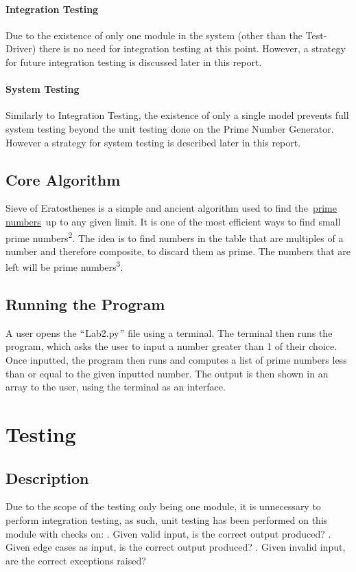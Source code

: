 \documentclass[]{article}
\begin{document}
\paragraph{Integration Testing}
Due to the existence of only one module in the system (other than the Test-Driver) there is no need for integration testing at this point. However, a strategy for future integration testing is discussed later in this report.

\paragraph{System Testing}
Similarly to Integration Testing, the existence of only a single model prevents full system testing beyond the unit testing done on the Prime Number Generator. However a strategy for system testing is described later in this report.

\subsection{Core Algorithm}
Sieve of Eratosthenes is a simple and ancient algorithm used to find the \href{https://brilliant.org/wiki/prime-numbers/}{prime numbers} up to any given limit. It is one of the most efficient ways to find small prime numbers\textsuperscript{2}. The idea is to find numbers in the table that are multiples of a number and therefore composite, to discard them as prime. The numbers that are left will be prime numbers\textsuperscript{3}.

\subsection{Running the Program}
A user opens the $``$Lab2.py$"$  file using a terminal. The terminal then runs the program, which asks the user to input a number greater than 1 of their choice. Once inputted, the program then runs and computes a list of prime numbers less than or equal to the given inputted number. The output is then shown in an array to the user, using the terminal as an interface.

\section{Testing}
\subsection{Description}
Due to the scope of the testing only being one module, it is unnecessary to perform integration testing, as such, unit testing has been performed on this module with checks on:
. Given valid input, is the correct output produced?
. Given edge cases as input, is the correct output produced?
. Given invalid input, are the correct exceptions raised?
\end{document}
